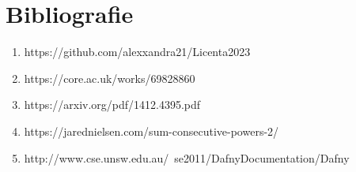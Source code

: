 \chapter*{Bibliografie} 

\begin{enumerate}
	\item https://github.com/alexxandra21/Licenta2023
	\item https://core.ac.uk/works/69828860
	\item https://arxiv.org/pdf/1412.4395.pdf
	\item https://jarednielsen.com/sum-consecutive-powers-2/
	\item http://www.cse.unsw.edu.au/~se2011/DafnyDocumentation/Dafny%
\end{enumerate}

